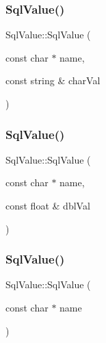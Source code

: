 \subsubsection{\texorpdfstring{Sql\+Value()}{SqlValue()}\hspace{0.1cm}{\footnotesize\ttfamily [3/5]}}
{\footnotesize\ttfamily Sql\+Value\+::\+Sql\+Value (\begin{DoxyParamCaption}\item[{const char $\ast$}]{name,  }\item[{const string \&}]{char\+Val }\end{DoxyParamCaption})\hspace{0.3cm}{\ttfamily [inline]}}

\mbox{\label{structSqlValue_aaa5d565de799694e1f1ed216251b3eee}} 
\subsubsection{\texorpdfstring{Sql\+Value()}{SqlValue()}\hspace{0.1cm}{\footnotesize\ttfamily [4/5]}}
{\footnotesize\ttfamily Sql\+Value\+::\+Sql\+Value (\begin{DoxyParamCaption}\item[{const char $\ast$}]{name,  }\item[{const float \&}]{dbl\+Val }\end{DoxyParamCaption})\hspace{0.3cm}{\ttfamily [inline]}}

\mbox{\label{structSqlValue_ad93f72e6c40c913a16dfa39573912f2b}} 
\subsubsection{\texorpdfstring{Sql\+Value()}{SqlValue()}\hspace{0.1cm}{\footnotesize\ttfamily [5/5]}}
{\footnotesize\ttfamily Sql\+Value\+::\+Sql\+Value (\begin{DoxyParamCaption}\item[{const char $\ast$}]{name }\end{DoxyParamCaption})\hspace{0.3cm}{\ttfamily [inline]}}



